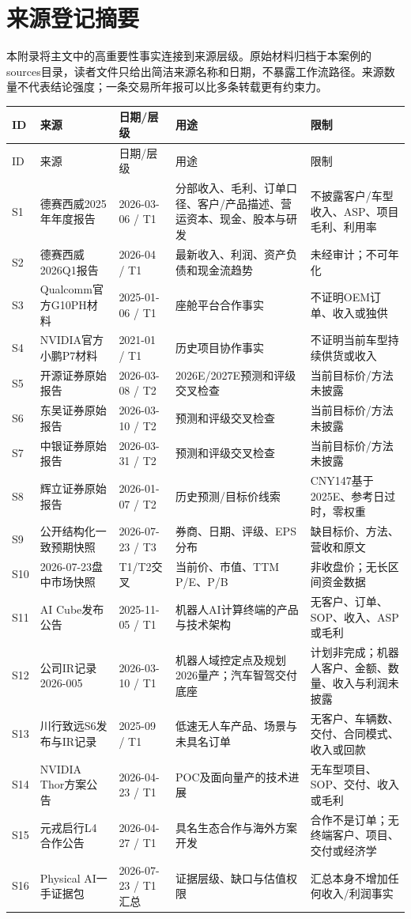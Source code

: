 \renewcommand{\arraystretch}{1.70}
\section{来源登记摘要}

本附录将主文中的高重要性事实连接到来源层级。原始材料归档于本案例的sources目录，读者文件只给出简洁来源名称和日期，不暴露工作流路径。来源数量不代表结论强度；一条交易所年报可以比多条转载更有约束力。

\begin{longtable}{L{1.4cm}L{3.2cm}L{2.1cm}L{2.1cm}L{5.2cm}}
\toprule
ID & 来源 & 日期/层级 & 用途 & 限制 \\
\midrule
\endfirsthead
\toprule
ID & 来源 & 日期/层级 & 用途 & 限制 \\
\midrule
\endhead
S1 & 德赛西威2025年年度报告 & 2026-03-06 / T1 & 分部收入、毛利、订单口径、客户/产品描述、营运资本、现金、股本与研发 & 不披露客户/车型收入、ASP、项目毛利、利用率 \\
S2 & 德赛西威2026Q1报告 & 2026-04 / T1 & 最新收入、利润、资产负债和现金流趋势 & 未经审计；不可年化 \\
S3 & Qualcomm官方G10PH材料 & 2025-01-06 / T1 & 座舱平台合作事实 & 不证明OEM订单、收入或独供 \\
S4 & NVIDIA官方小鹏P7材料 & 2021-01 / T1 & 历史项目协作事实 & 不证明当前车型持续供货或收入 \\
S5 & 开源证券原始报告 & 2026-03-08 / T2 & 2026E/2027E预测和评级交叉检查 & 当前目标价/方法未披露 \\
S6 & 东吴证券原始报告 & 2026-03-10 / T2 & 预测和评级交叉检查 & 当前目标价/方法未披露 \\
S7 & 中银证券原始报告 & 2026-03-31 / T2 & 预测和评级交叉检查 & 当前目标价/方法未披露 \\
S8 & 辉立证券原始报告 & 2026-01-07 / T2 & 历史预测/目标价线索 & CNY147基于2025E、参考日过时，零权重 \\
S9 & 公开结构化一致预期快照 & 2026-07-23 / T3 & 券商、日期、评级、EPS分布 & 缺目标价、方法、营收和原文 \\
S10 & 2026-07-23盘中市场快照 & T1/T2交叉 & 当前价、市值、TTM P/E、P/B & 非收盘价；无长区间资金数据 \\
S11 & AI Cube发布公告 & 2025-11-05 / T1 & 机器人AI计算终端的产品与技术架构 & 无客户、订单、SOP、收入、ASP或毛利 \\
S12 & 公司IR记录2026-005 & 2026-03-10 / T1 & 机器人域控定点及规划2026量产；汽车智驾交付底座 & 计划非完成；机器人客户、金额、数量、收入与利润未披露 \\
S13 & 川行致远S6发布与IR记录 & 2025-09 / T1 & 低速无人车产品、场景与未具名订单 & 无客户、车辆数、交付、合同模式、收入或回款 \\
S14 & NVIDIA Thor方案公告 & 2026-04-23 / T1 & POC及面向量产的技术进展 & 无车型项目、SOP、交付、收入或毛利 \\
S15 & 元戎启行L4合作公告 & 2026-04-27 / T1 & 具名生态合作与海外方案开发 & 合作不是订单；无终端客户、项目、交付或经济学 \\
S16 & Physical AI一手证据包 & 2026-07-23 / T1汇总 & 证据层级、缺口与估值权限 & 汇总本身不增加任何收入/利润事实 \\
\bottomrule
\end{longtable}

